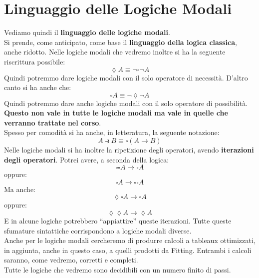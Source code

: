 \documentclass[a4paper,12pt, oneside]{book}
\begin{document}
\section{Linguaggio delle Logiche Modali}
Vediamo quindi il \textbf{linguaggio delle logiche modali}.\\
Si prende, come anticipato, come base il \textbf{linguaggio della logica
  classica}, anche ridotto. Nelle logiche modali che vedremo inoltre si ha la
seguente riscrittura possibile:
\[\lozenge A\equiv\neg \square\neg A\]
Quindi potremmo dare logiche modali con il solo operatore di necessità. D'altro
canto si ha anche che:
\[\square A\equiv \neg\lozenge\neg A\]
Quindi potremmo dare anche logiche modali con il solo operatore di
possibilità. \textbf{Questo non vale in tutte le logiche modali ma vale in
  quelle che verranno trattate nel corso}.\\
Spesso per comodità si ha anche, in letteratura, la seguente notazione:
\[A\strictif B\equiv \square(A\to B)\]
Nelle logiche modali si ha inoltre la ripetizione degli operatori, avendo
\textbf{iterazioni degli operatori}. Potrei avere,
a seconda della logica:
\[\square\square A\to \square A\]
oppure:
\[\square A\to\square\square A\]
Ma anche:
\[\lozenge \square A\to \square A\]
oppure:
\[\lozenge\lozenge A\to\lozenge A\]
E in alcune logiche potrebbero ``appiattire'' queste iterazioni. Tutte queste
sfumature sintattiche corrispondono a logiche modali diverse.\\
Anche per le logiche modali cercheremo di produrre calcoli a tableaux
ottimizzati, in aggiunta, anche in questo caso, a quelli prodotti da
Fitting. Entrambi i calcoli saranno, come vedremo, corretti e completi.\\
Tutte le logiche che vedremo sono decidibili con un numero finito di passi.
\end{document}
